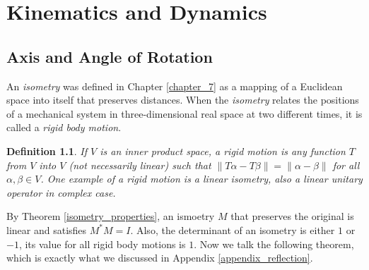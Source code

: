 \documentclass[11pt]{book}
\newtheorem{definition}{Definition}[chapter]
\theoremstyle{definition}
\numberwithin{equation}{chapter}
\begin{document}
\chapter{Kinematics and Dynamics}
\section{Axis and Angle of Rotation}

An {\em isometry} was defined in Chapter \ref{chapter_7} as a mapping of a Euclidean space into itself that preserves distances. When the {\em isometry} relates the positions of a mechanical system in three-dimensional real space at two different times, it is called a {\em rigid body motion}.

\medskip

\begin{definition}{\rm \cite{33}}
If $V$ is an inner product space, a rigid motion is any function $T$ from $V$ into $V$ (not necessarily linear) such that $\left\|T\alpha - T\beta\right\| = \left\|\alpha - \beta\right\|$ for all $\alpha, \beta \in V$. One example of a rigid motion is a linear isometry, also a linear unitary operator in complex case. 
\end{definition}

\medskip

By Theorem \ref{isometry_properties}, an ismoetry $M$ that preserves the original is linear and satisfies $M^*M = I$. Also, the determinant of an isometry is either $1$ or $-1$, its value for all rigid body motions is $1$. Now we talk the following theorem, which is exactly what we discussed in Appendix \ref{appendix_reflection}.

\medskip
\end{document}
